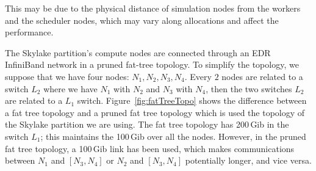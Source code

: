 This may be due to the physical distance of simulation nodes from the workers and the scheduler nodes, which may vary along allocations and affect the performance. 

The Skylake partition's compute nodes are connected through an EDR InfiniBand network in a pruned fat-tree topology. 
To simplify the topology, we suppose that we have four nodes: $N_1, N_2, N_3, N_4$. Every $2$ nodes are related to a switch $L_2$ where we have $N_1 $ with $ N_2$ and $N_3 $ with $ N_4$, then the two switches $L_2$ are related to a $L_1$ switch. 
Figure~\ref{fig:fatTreeTopo} shows the difference between a fat tree topology and a pruned fat tree topology which is used the topology of the Skylake partition we are using. The fat tree topology has 200\,Gib in the switch $L_1$; this maintains the 100\,Gib over all the nodes. However, in the pruned fat tree topology, a 100\,Gib link has been used, which makes communications between $N_1$ and $[N_3, N_4]$  or  $N_2$ and $[N_3, N_4]$ potentially longer, and vice versa.    

